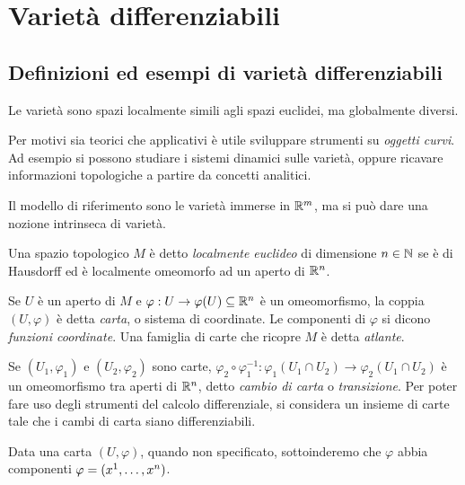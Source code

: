 \chapter{Varietà differenziabili}

\section{Definizioni ed esempi di varietà differenziabili}
 
 Le varietà sono spazi localmente simili agli spazi euclidei, ma globalmente diversi.
 
 Per motivi sia teorici che applicativi è utile sviluppare strumenti su \emph{oggetti curvi}.
 Ad esempio si possono studiare i sistemi dinamici sulle varietà, oppure ricavare
 informazioni topologiche a partire da concetti analitici.
 
 Il modello di riferimento sono le varietà immerse in $\R^m$, ma si può dare
 una nozione intrinseca di varietà.
 
 \begin{definition} 
 Una spazio topologico $M$ è detto \emph{localmente euclideo} di dimensione $n\in\N$ se è di Hausdorff ed è localmente omeomorfo ad un aperto di $\R^n$.
 \end{definition}
 
 \begin{definition}   
 Se $U$ è un aperto di $M$ e $\varphi:U\to \varphi(U)\subseteq \R^n$
 è un omeomorfismo, la coppia $(U, \varphi)$ è detta \emph{carta}, o sistema di coordinate.
 Le componenti di $\varphi$ si dicono \emph{funzioni coordinate}. Una famiglia di carte
 che ricopre $M$ è detta \emph{atlante}.
 \end{definition}
 
 Se $(U_1, \varphi_1)$ e $(U_2, \varphi_2)$ sono carte, $\varphi_2\circ\varphi_1^{-1}:\varphi_1(U_1\cap U_2)\to\varphi_2(U_1\cap U_2)$
 è un omeomorfismo tra aperti di $\R^n$, detto \emph{cambio di carta} o \emph{transizione}.
 Per poter fare uso degli strumenti del calcolo differenziale, si considera un insieme
 di carte tale che i cambi di carta siano differenziabili.
 
\begin{remark}
	Data una carta $(U,\varphi)$, quando non specificato, sottoinderemo che $\varphi$ abbia componenti $\varphi=(\seqa xn,)$.
\end{remark}


